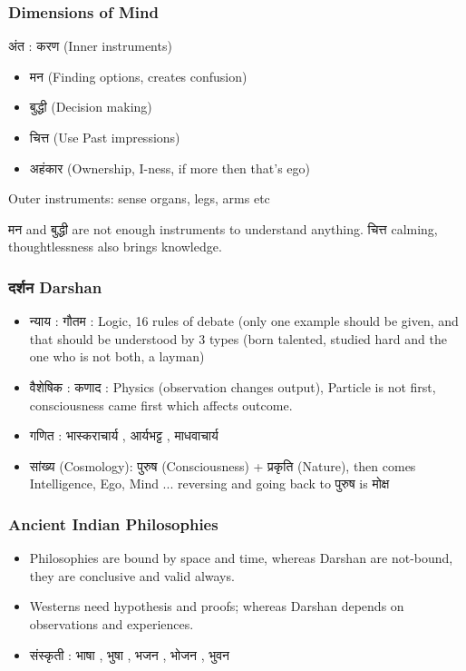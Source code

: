 \begin{frame}[fragile]\frametitle{Dimensions of Mind}
अंत : करण (Inner instruments)
\begin{itemize}
	\item मन  (Finding options, creates confusion)
	\item बुद्धी  (Decision making)
	\item चित्त (Use Past impressions)
	\item अहंकार (Ownership, I-ness, if more then that's ego)
\end{itemize}

Outer instruments: sense organs, legs, arms etc

मन and बुद्धी are not enough instruments to understand anything. चित्त calming, thoughtlessness also brings knowledge.
\end{frame}

\begin{frame}[fragile]\frametitle{दर्शन Darshan}
\begin{itemize}
	\item न्याय :  गौतम :  Logic, 16 rules of debate (only one example should be given, and that should be understood by 3 types (born talented, studied hard and the one who is not both, a layman)
	\item  वैशेषिक :  कणाद : Physics (observation changes output), Particle is not first, consciousness came first which affects outcome.
	\item गणित :  भास्कराचार्य , आर्यभट्ट ,  माधवाचार्य 
	\item सांख्य (Cosmology): पुरुष (Consciousness) + प्रकृति (Nature), then comes Intelligence, Ego, Mind ... reversing and going back to पुरुष is मोक्ष 
\end{itemize}

\end{frame}

\begin{frame}[fragile]\frametitle{Ancient Indian Philosophies}
\begin{itemize}
	\item Philosophies are bound by space and time, whereas Darshan are not-bound, they are conclusive and valid always.
	\item Westerns need hypothesis and proofs; whereas Darshan depends on observations and experiences.
	\item संस्कृती :  भाषा ,  भुषा , भजन ,  भोजन ,  भुवन 
\end{itemize}

\end{frame}

